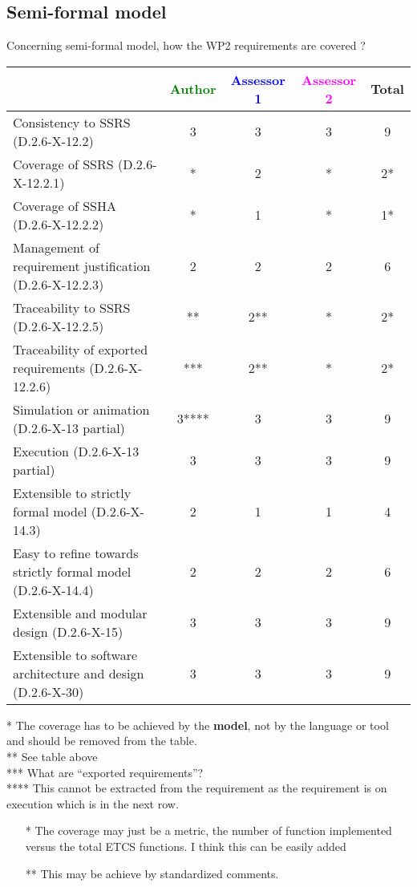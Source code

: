 \subsection{Semi-formal model}

Concerning semi-formal model, how the WP2 requirements are covered ?

\begin{tabular}{|l | c | c | c | c|}
\hline
& \textcolor{green}{Author} & \textcolor{blue}{Assessor 1} & \textcolor{magenta}{Assessor 2} & Total \\
\hline
Consistency to SSRS (D.2.6-X-12.2) &3 &3 &3 & 9 \\
\hline
Coverage of SSRS (D.2.6-X-12.2.1) &* &2 &* & 2* \\
\hline
Coverage of SSHA (D.2.6-X-12.2.2) &* &1 &* & 1* \\
\hline
Management of requirement justification (D.2.6-X-12.2.3) &2 &2 &2 & 6 \\
\hline
Traceability to SSRS (D.2.6-X-12.2.5) &** &2** &* & 2* \\
\hline
Traceability of exported requirements (D.2.6-X-12.2.6) &*** & 2**&* & 2* \\
\hline
Simulation or animation (D.2.6-X-13 partial) &3**** & 3 &3 & 9 \\
\hline
Execution (D.2.6-X-13 partial) &3 &3 &3 & 9 \\
\hline
Extensible to strictly formal model (D.2.6-X-14.3) &2 &1 &1 & 4 \\
\hline
Easy to refine towards strictly formal model (D.2.6-X-14.4) &2 &2 &2 & 6 \\
\hline
Extensible and modular design (D.2.6-X-15) &3 &3 &3 & 9 \\
\hline
Extensible to software architecture and design (D.2.6-X-30) &3 &3 &3 & 9 \\
\hline
\end{tabular}

\begin{author_comment}
* The coverage has to be achieved by the \textbf{model}, not by the language or tool and should be removed from the table.\\
** See table above\\
*** What are ``exported requirements''?\\
**** This cannot be extracted from the requirement as the requirement is on execution which is in the next row.
\end{author_comment}
\begin{assessor1}
\begin{itemize}
\item[*] The coverage may just be a metric, the number of function
  implemented versus the total ETCS functions. I think this can be
  easily added
\item[**] This may be achieve by standardized comments.
\end{itemize}
\end{assessor1}

